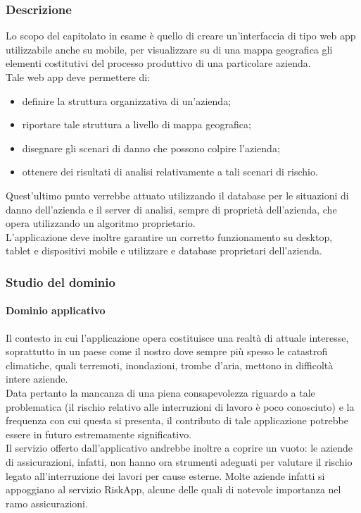 		\subsubsection{Descrizione}
		Lo scopo del capitolato in esame è quello di creare un'interfaccia di tipo web app utilizzabile anche su mobile, per visualizzare su di una 
		mappa geografica gli elementi costitutivi del processo produttivo di una particolare azienda.
		\\Tale web app deve permettere di:
		\begin{itemize}
			\item definire la struttura organizzativa di un'azienda;
			\item riportare tale struttura a livello di mappa geografica;
			\item disegnare gli scenari di danno che possono colpire l'azienda;
			\item ottenere dei risultati di analisi relativamente a tali scenari di rischio.
		\end{itemize}
		Quest'ultimo punto verrebbe attuato utilizzando il database per le situazioni di danno dell'azienda e il server di analisi, sempre di proprietà dell'azienda,
		che opera utilizzando un algoritmo proprietario.
		\\L'applicazione deve inoltre garantire un corretto funzionamento su desktop, tablet e dispositivi mobile e utilizzare  e database proprietari dell'azienda.
		\subsubsection{Studio del dominio}
			\paragraph{Dominio applicativo}
			Il contesto in cui l'applicazione opera costituisce una realtà di attuale interesse, soprattutto in un paese come il nostro dove sempre più spesso le catastrofi climatiche,
			quali terremoti, inondazioni, trombe d'aria, mettono in difficoltà intere aziende.
			\\Data pertanto la mancanza di una piena consapevolezza riguardo a tale problematica (il rischio relativo alle interruzioni di lavoro è poco conosciuto) 
			e la frequenza con cui questa si presenta, il contributo di tale applicazione potrebbe essere in futuro estremamente significativo.
			\\Il servizio offerto dall'applicativo andrebbe inoltre a coprire un vuoto: le aziende di assicurazioni, infatti, non hanno ora strumenti 
			adeguati per valutare il rischio legato all'interruzione dei lavori per cause esterne. Molte aziende infatti si appoggiano al servizio 
			RiskApp, alcune delle quali di notevole importanza nel ramo assicurazioni.
